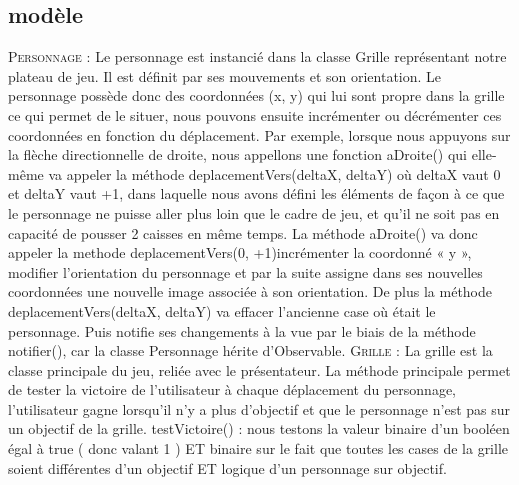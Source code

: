 \documentclass[a4paper,12pt]{article} %
\begin{document}
\subsection{modèle}
\noindent 
\newline\newline
\textsc{Personnage :}
\newline\newline
Le personnage est instancié dans la classe Grille représentant notre plateau de jeu. Il est définit par ses mouvements et son orientation.
Le personnage possède donc des coordonnées (x, y) qui lui sont propre dans la grille ce qui permet de le situer, nous pouvons ensuite incrémenter ou décrémenter ces coordonnées en fonction du déplacement.
\newline
Par exemple, lorsque nous appuyons sur la flèche directionnelle de droite, nous appellons une fonction aDroite() qui elle-même va appeler la méthode deplacementVers(deltaX, deltaY) où deltaX vaut 0 et deltaY vaut +1, dans laquelle nous avons défini les éléments de façon à ce que le personnage ne puisse aller plus loin que le cadre de jeu, et qu'il ne soit pas en capacité de pousser 2 caisses en même temps.
\newline
La méthode aDroite() va donc appeler la methode deplacementVers(0, +1)incrémenter la coordonné « y », modifier l’orientation du personnage et par la suite assigne dans ses nouvelles coordonnées une nouvelle image associée à son orientation.
De plus la méthode deplacementVers(deltaX, deltaY) va effacer l’ancienne case où était le personnage.
Puis notifie ses changements à la vue par le biais de la méthode notifier(), car la classe Personnage hérite d’Observable.
\newline\newline
\textsc{Grille :}
\newline\newline
La grille est la classe principale du jeu, reliée avec le présentateur.
La méthode principale permet de tester la victoire de l’utilisateur à chaque déplacement du personnage, l’utilisateur gagne lorsqu’il n'y a plus d’objectif et que le personnage n'est pas sur un objectif de la grille.
\newline\newline
testVictoire() : 
\newline\newline
nous testons la valeur binaire d’un booléen égal à true ( donc valant 1 ) ET binaire sur le fait que toutes les cases de la grille soient différentes d’un objectif ET logique d’un personnage sur objectif.
\end{document}
